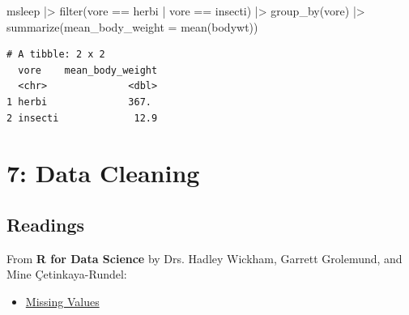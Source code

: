 \documentclass[
  letterpaper,
  DIV=11,
  numbers=noendperiod]{scrreprt}
\newenvironment{Shaded}{\begin{snugshade}}{\end{snugshade}}
\newcommand{\AttributeTok}[1]{\textcolor[rgb]{0.40,0.45,0.13}{#1}}
\newcommand{\FunctionTok}[1]{\textcolor[rgb]{0.28,0.35,0.67}{#1}}
\newcommand{\NormalTok}[1]{\textcolor[rgb]{0.00,0.23,0.31}{#1}}
\newcommand{\SpecialCharTok}[1]{\textcolor[rgb]{0.37,0.37,0.37}{#1}}
\newcommand{\StringTok}[1]{\textcolor[rgb]{0.13,0.47,0.30}{#1}}
\providecommand{\tightlist}{%
  \setlength{\itemsep}{0pt}\setlength{\parskip}{0pt}}\usepackage{longtable,booktabs,array}
\begin{document}
\begin{tcolorbox}[enhanced jigsaw, colbacktitle=quarto-callout-tip-color!10!white, opacitybacktitle=0.6, breakable, left=2mm, leftrule=.75mm, toprule=.15mm, toptitle=1mm, bottomtitle=1mm, colframe=quarto-callout-tip-color-frame, opacityback=0, coltitle=black, arc=.35mm, titlerule=0mm, colback=white, bottomrule=.15mm, title=\textcolor{quarto-callout-tip-color}{\faLightbulb}\hspace{0.5em}{Answer}, rightrule=.15mm]

\begin{Shaded}
\begin{Highlighting}[]
\NormalTok{msleep }\SpecialCharTok{|\textgreater{}}
  \FunctionTok{filter}\NormalTok{(vore }\SpecialCharTok{==} \StringTok{\textquotesingle{}herbi\textquotesingle{}} \SpecialCharTok{|}\NormalTok{ vore }\SpecialCharTok{==} \StringTok{\textquotesingle{}insecti\textquotesingle{}}\NormalTok{) }\SpecialCharTok{|\textgreater{}}
  \FunctionTok{group\_by}\NormalTok{(vore) }\SpecialCharTok{|\textgreater{}}
  \FunctionTok{summarize}\NormalTok{(}\AttributeTok{mean\_body\_weight =} \FunctionTok{mean}\NormalTok{(bodywt))}
\end{Highlighting}
\end{Shaded}

\begin{verbatim}
# A tibble: 2 x 2
  vore    mean_body_weight
  <chr>              <dbl>
1 herbi              367. 
2 insecti             12.9
\end{verbatim}

\end{tcolorbox}

\chapter{7: Data Cleaning}\label{data-cleaning}

\section{Readings}\label{readings-8}

From \textbf{R for Data Science} by Drs. Hadley Wickham, Garrett
Grolemund, and Mine Çetinkaya-Rundel:

\begin{itemize}
\tightlist
\item
  \href{https://r4ds.hadley.nz/missing-values.html}{Missing Values}
\end{itemize}
\end{document}
